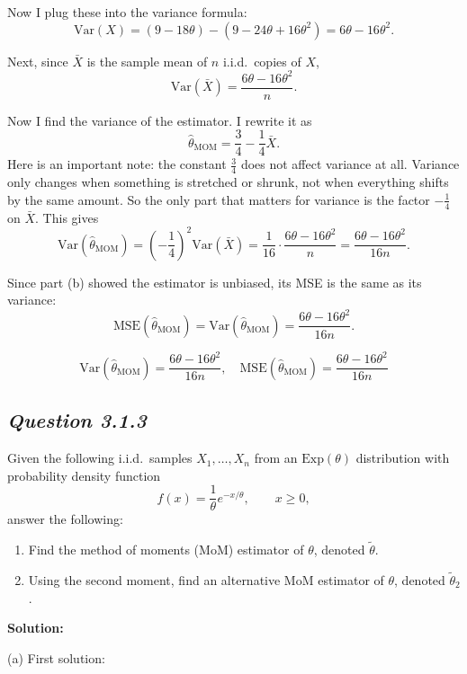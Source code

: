 \documentclass[11pt,letterpaper]{article}
\theoremstyle{remark}
\begin{document}
Now I plug these into the variance formula:
\[
\mathrm{Var}(X)
= (9 - 18\theta) - (9 - 24\theta + 16\theta^2)
= 6\theta - 16\theta^2.
\]

Next, since $\bar X$ is the sample mean of $n$ i.i.d.\ copies of $X$,
\[
\mathrm{Var}(\bar X)
= \frac{6\theta - 16\theta^2}{n}.
\]

Now I find the variance of the estimator. I rewrite it as
\[
\hat\theta_{\text{MOM}}
= \frac{3}{4} - \frac{1}{4}\bar X.
\]
Here is an important note: the constant $\frac{3}{4}$ does not affect
variance at all. Variance only changes when something is stretched or
shrunk, not when everything shifts by the same amount. So the only part
that matters for variance is the factor $-\frac{1}{4}$ on $\bar X$.
This gives
\[
\mathrm{Var}(\hat\theta_{\text{MOM}})
= \left(-\frac{1}{4}\right)^2 \mathrm{Var}(\bar X)
= \frac{1}{16} \cdot \frac{6\theta - 16\theta^2}{n}
= \frac{6\theta - 16\theta^2}{16n}.
\]

Since part (b) showed the estimator is unbiased, its MSE is the same as its variance:
\[
\mathrm{MSE}(\hat\theta_{\text{MOM}})
= \mathrm{Var}(\hat\theta_{\text{MOM}})
= \frac{6\theta - 16\theta^2}{16n}.
\]

\[
\boxed{\mathrm{Var}(\hat\theta_{\text{MOM}}) = \frac{6\theta - 16\theta^2}{16n}, \quad \mathrm{MSE}(\hat\theta_{\text{MOM}}) = \frac{6\theta - 16\theta^2}{16n}}
\]

\subsection*{\textit{Question 3.1.3}}

Given the following i.i.d.\ samples $X_1, \ldots, X_n$ from an $\mathrm{Exp}(\theta)$ distribution with
probability density function
\[
f(x) = \frac{1}{\theta} e^{-x/\theta}, \qquad x \ge 0,
\]
answer the following:

\begin{enumerate}
    \item[(a)] Find the method of moments (MoM) estimator of $\theta$, denoted $\tilde{\theta}$.
    \item[(b)] Using the second moment, find an alternative MoM estimator of $\theta$, denoted $\tilde{\theta}_2$.
\end{enumerate}

\vspace{1cm}

\textbf{Solution:}

(a) First solution:
\end{document}
